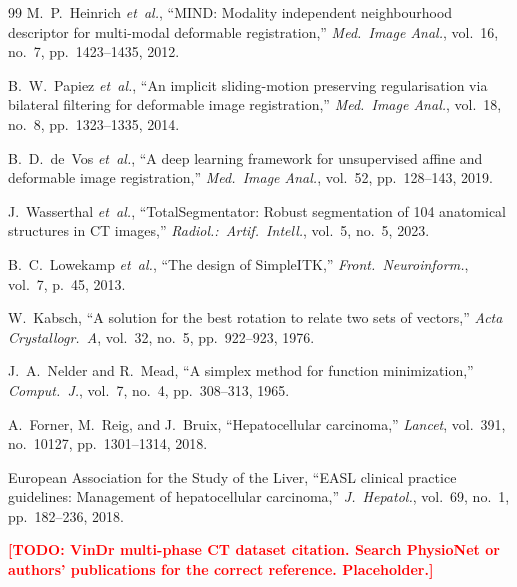 \documentclass[10pt,twocolumn]{article}
\newcommand{\TODO}[1]{\textcolor{red}{\textbf{[TODO: #1]}}}
\begin{document}
\begin{thebibliography}{99}
M.~P.~Heinrich \emph{et~al.},
``MIND: Modality independent neighbourhood descriptor for multi-modal
deformable registration,''
\emph{Med.\ Image Anal.}, vol.~16, no.~7, pp.~1423--1435, 2012.

B.~W.~Papiez \emph{et~al.},
``An implicit sliding-motion preserving regularisation via bilateral
filtering for deformable image registration,''
\emph{Med.\ Image Anal.}, vol.~18, no.~8, pp.~1323--1335, 2014.

B.~D.~de~Vos \emph{et~al.},
``A deep learning framework for unsupervised affine and deformable
image registration,''
\emph{Med.\ Image Anal.}, vol.~52, pp.~128--143, 2019.

J.~Wasserthal \emph{et~al.},
``TotalSegmentator: Robust segmentation of 104 anatomical structures
in CT images,''
\emph{Radiol.:\ Artif.\ Intell.}, vol.~5, no.~5, 2023.

B.~C.~Lowekamp \emph{et~al.},
``The design of SimpleITK,''
\emph{Front.\ Neuroinform.}, vol.~7, p.~45, 2013.

W.~Kabsch,
``A solution for the best rotation to relate two sets of vectors,''
\emph{Acta Crystallogr.\ A}, vol.~32, no.~5, pp.~922--923, 1976.

J.~A.~Nelder and R.~Mead,
``A simplex method for function minimization,''
\emph{Comput.\ J.}, vol.~7, no.~4, pp.~308--313, 1965.

A.~Forner, M.~Reig, and J.~Bruix,
``Hepatocellular carcinoma,''
\emph{Lancet}, vol.~391, no.~10127, pp.~1301--1314, 2018.

European Association for the Study of the Liver,
``EASL clinical practice guidelines: Management of hepatocellular
carcinoma,''
\emph{J.\ Hepatol.}, vol.~69, no.~1, pp.~182--236, 2018.

\TODO{VinDr multi-phase CT dataset citation. Search PhysioNet or
  authors' publications for the correct reference. Placeholder.}

\end{thebibliography}
\end{document}
